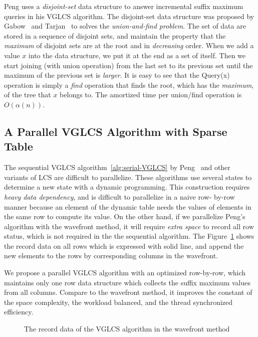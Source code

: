Peng uses a {\em disjoint-set} data structure to answer incremental
suffix maximum queries in his VGLCS algorithm.  The disjoint-set data
structure was proposed by Gabow~\cite{Gabow1983ALA} and
Tarjan~\cite{Tarjan1975EfficiencyOA} to solves the {\em union-and-find
  problem}.  The set of data are stored in a sequence of disjoint
sets, and maintain the property that the {\em maximum} of disjoint
sets are at the root and in {\em decreasing} order.  When we add a
value $x$ into the data structure, we put it at the end as a set of
itself.  Then we start joining (with union operation) from the last
set to its previous set until the maximum of the previous set is {\em
  larger}.  It is easy to see that the {\sc Query(x)} operation is
simply a {\em find} operation that finds the root, which has the {\em
  maximum}, of the tree that $x$ belongs to.  The amortized time per
union/find operation is $O(\alpha(n))$.

\subsection{A Parallel VGLCS Algorithm with Sparse Table}

The sequential VGLCS algorithm~\ref{alg:serial-VGLCS} by
Peng~\cite{Peng2011TheLC} and other variants of LCS are difficult to
parallelize.  These algorithms use several states to determine a new
state with a dynamic programming.  This construction requires {\em heavy
data dependency}, and is difficult to parallelize in a naive row- by-row
manner because an element of the dynamic table needs the values of
elements in the same row to compute its value.  On the other hand, if we
parallelize Peng's algorithm with the wavefront method, it will require
{\em extra space} to record all row status, which is not required in the
the sequential algorithm.  The Figure~\ref{fig:fig-VGLCS-dp-wavefront}
shows the record data on all rows which is expressed with solid line, and
append the new elements to the rows by corresponding columns in the
wavefront.

We propose a parallel VGLCS algorithm with an optimized row-by-row,
which maintains only one row data structure which collects the suffix
maximum values from all columns.  Compare to the wavefront method, it
improves the constant of the space complexity, the workload balanced,
and the thread synchronized efficiency.


\begin{figure}[!thb]
  \centering {} 
  \caption{The record data of the VGLCS algorithm in the wavefront method}
  \label{fig:fig-VGLCS-dp-wavefront}
\end{figure}

